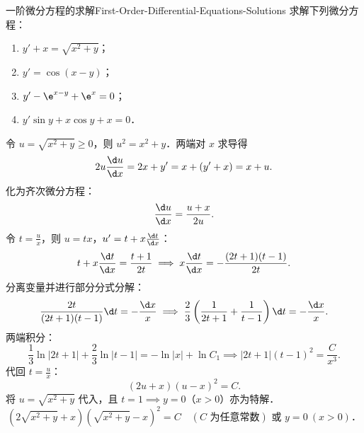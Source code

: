 \begin{problem}{一阶微分方程的求解}{First-Order-Differential-Equations-Solutions}
    求解下列微分方程：
    \begin{enumerate}
        \item $y' + x = \sqrt{x^2 + y}$；
        \item $y' = \cos(x - y)$；
        \item $y' - \e^{x-y} + \e^x = 0$；
        \item $y' \sin y + x \cos y + x = 0$．
    \end{enumerate}
\end{problem}

\begin{solution}

    令 $u = \sqrt{x^2 + y} \geqslant 0$，则 $u^2 = x^2 + y$．两端对 $x$ 求导得
    \begin{equation}
        2u \frac{\d u}{\d x} = 2x + y' = x + (y' + x) = x + u.
    \end{equation}
    化为齐次微分方程：
    \begin{equation}
        \frac{\d u}{\d x} = \frac{u + x}{2u}.
    \end{equation}
    令 $t = \frac{u}{x}$，则 $u = tx$，$u' = t + x \frac{\d t}{\d x}$：
    \begin{equation}
        t + x \frac{\d t}{\d x} = \frac{t + 1}{2t} \implies x \frac{\d t}{\d x} = -\frac{(2t + 1)(t - 1)}{2t}.
    \end{equation}
    分离变量并进行部分分式分解：
    \begin{equation}
        \frac{2t}{(2t + 1)(t - 1)}\d t = -\frac{\d x}{x} \implies \frac{2}{3}\left( \frac{1}{2t + 1} + \frac{1}{t - 1} \right)\d t = -\frac{\d x}{x}.
    \end{equation}
    两端积分：
    \begin{equation}
        \frac{1}{3}\ln|2t + 1| + \frac{2}{3}\ln|t - 1| = -\ln|x| + \ln C_1 \implies |2t + 1|(t - 1)^2 = \frac{C}{x^3}.
    \end{equation}
    代回 $t = \frac{u}{x}$：
    \begin{equation}
        (2u + x)(u - x)^2 = C.
    \end{equation}
    将 $u = \sqrt{x^2 + y}$ 代入，且 $t = 1 \implies y = 0$（$x > 0$）亦为特解．
    \begin{equation}
        \boxed{(2\sqrt{x^2+y} + x)(\sqrt{x^2+y} - x)^2 = C \quad (C \text{ 为任意常数}) \text{ 或 } y = 0 \ (x > 0)．}
    \end{equation}


\end{solution}
